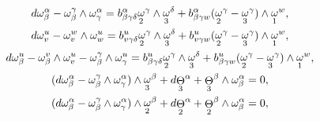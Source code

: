 \begin{gather*}


d \omega^{\alpha}_{\beta} - \omega^{\gamma}_{\beta}\wedge


\omega^{\alpha}_{\gamma}=


b^{\alpha}_{\beta \gamma \delta}


{\crazy{\omega}{2}}^{\gamma}\wedge{\crazy{\omega}{3}}^{\delta}+


b^{\alpha}_{\beta \gamma w}


({\crazy{\omega}{2}}^{\gamma}-{\crazy{\omega}{3}}^{\gamma})


\wedge{\crazy{\omega}{1}}^{w},\\


%


d {\omega}^{u}_{v} - \omega^{w}_{v}\wedge


\omega^{u}_{w}=b^{u}_{v \gamma \delta}


{\crazy{\omega}{2}}^{\gamma}\wedge{\crazy{\omega}{3}}^{\delta}+


b^{u}_{v \gamma w}


({\crazy{\omega}{2}}^{\gamma}-{\crazy{\omega}{3}}^{\gamma})


\wedge{\crazy{\omega}{1}}^{w},\\


%


d {\omega}^{u}_{\beta} - \omega^{v}_{\beta}\wedge


\omega^{u}_{v}- \omega^{\gamma}_{\beta}\wedge


\omega^{u}_{\gamma}=b^{u}_{\beta \gamma \delta}


{\crazy{\omega}{2}}^{\gamma}\wedge{\crazy{\omega}{3}}^{\delta}+


b^{u}_{\beta \gamma w}


({\crazy{\omega}{2}}^{\gamma}-{\crazy{\omega}{3}}^{\gamma})


\wedge{\crazy{\omega}{1}}^{w},\\


%


(d \omega^{\alpha}_{\beta} - \omega^{\gamma}_{\beta}\wedge


\omega^{\alpha}_{\gamma})\wedge{\crazy{\omega}{3}}^{\beta}+


d{\crazy{\Theta}{3}}^{\alpha}+{\crazy{\Theta}{3}}^{\beta}\wedge


\omega^{\alpha}_{\beta}=0,\\


%


(d \omega^{\alpha}_{\beta} - \omega^{\gamma}_{\beta}\wedge


\omega^{\alpha}_{\gamma})\wedge{\crazy{\omega}{2}}^{\beta}+


d{\crazy{\Theta}{2}}^{\alpha}+{\crazy{\Theta}{2}}^{\beta}\wedge


\omega^{\alpha}_{\beta}=0,


\end{gather*}


